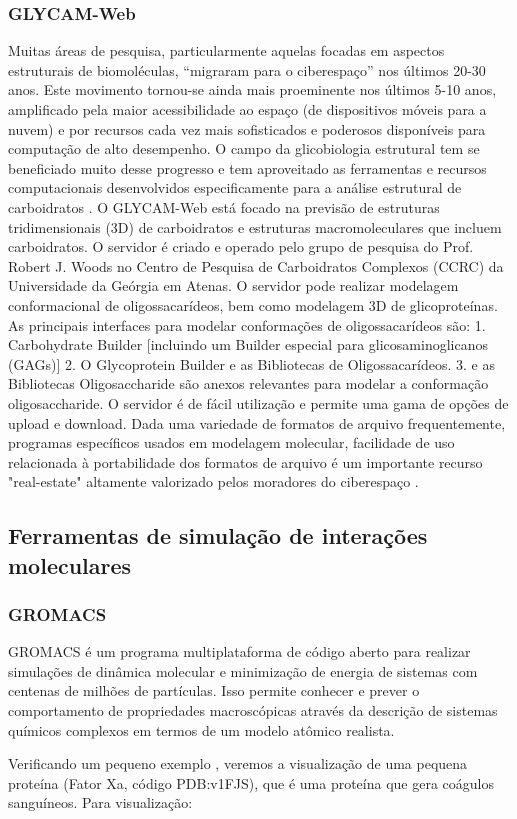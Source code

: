 \documentclass[11pt, letterpaper, portuguese]{article}
\begin{document}
\subsubsection{GLYCAM-Web}
Muitas áreas de pesquisa, particularmente aquelas focadas em aspectos estruturais de biomoléculas, “migraram para o ciberespaço” nos últimos 20-30 anos. Este movimento tornou-se ainda mais proeminente nos últimos 5-10 anos, amplificado pela maior acessibilidade ao espaço (de dispositivos móveis para a nuvem) e por recursos cada vez mais sofisticados e poderosos disponíveis para computação de alto desempenho. O campo da glicobiologia estrutural tem se beneficiado muito desse progresso e tem aproveitado as ferramentas e recursos computacionais desenvolvidos especificamente para a análise estrutural de carboidratos \cite{Yuriev_2015}.
O GLYCAM-Web está focado na previsão de estruturas tridimensionais (3D) de carboidratos e estruturas macromoleculares que incluem carboidratos. O servidor é criado e operado pelo grupo de pesquisa do Prof. Robert J. Woods no Centro de Pesquisa de Carboidratos Complexos (CCRC) da Universidade da Geórgia em Atenas. O servidor pode realizar modelagem conformacional de oligossacarídeos, bem como modelagem 3D de glicoproteínas.  
As principais interfaces para modelar conformações de oligossacarídeos são:
1. Carbohydrate Builder [incluindo um Builder especial para glicosaminoglicanos (GAGs)]
2. O  Glycoprotein Builder e as Bibliotecas de Oligossacarídeos.  
3. e as Bibliotecas Oligosaccharide são anexos relevantes para modelar a conformação oligosaccharide. O servidor é de fácil utilização e permite uma gama de opções de upload e download.
Dada uma variedade de formatos de arquivo frequentemente, programas específicos usados em modelagem molecular, facilidade de uso relacionada à portabilidade dos formatos de arquivo é um importante recurso "real-estate" altamente valorizado pelos moradores do ciberespaço \cite{Yuriev_2015}.

    \subsection{Ferramentas de simulação de interações moleculares}
                \subsubsection{GROMACS}
        \par{GROMACS é um programa multiplataforma de código aberto para realizar simulações de dinâmica molecular e minimização de energia de sistemas com centenas de milhões de partículas. Isso permite conhecer e prever o comportamento de propriedades macroscópicas através da descrição de sistemas químicos complexos em termos de um modelo atômico realista.}
        \par{Verificando um pequeno exemplo \cite{Villa_2017}, veremos a visualização de uma pequena proteína (Fator Xa, código PDB:v1FJS), que é uma proteína que gera coágulos sanguíneos.
Para visualização:
}
        \\
        
\end{document}
